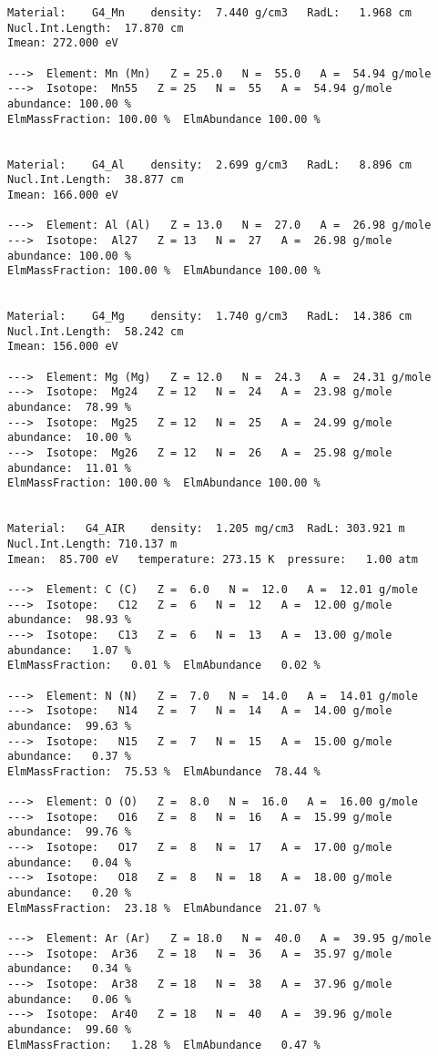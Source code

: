 {\begin{verbatim}
Material:    G4_Mn    density:  7.440 g/cm3   RadL:   1.968 cm   Nucl.Int.Length:  17.870 cm 
Imean: 272.000 eV 

--->  Element: Mn (Mn)   Z = 25.0   N =  55.0   A =  54.94 g/mole
--->  Isotope:  Mn55   Z = 25   N =  55   A =  54.94 g/mole   abundance: 100.00 %
ElmMassFraction: 100.00 %  ElmAbundance 100.00 % 


Material:    G4_Al    density:  2.699 g/cm3   RadL:   8.896 cm   Nucl.Int.Length:  38.877 cm 
Imean: 166.000 eV 

--->  Element: Al (Al)   Z = 13.0   N =  27.0   A =  26.98 g/mole
--->  Isotope:  Al27   Z = 13   N =  27   A =  26.98 g/mole   abundance: 100.00 %
ElmMassFraction: 100.00 %  ElmAbundance 100.00 % 


Material:    G4_Mg    density:  1.740 g/cm3   RadL:  14.386 cm   Nucl.Int.Length:  58.242 cm 
Imean: 156.000 eV 

--->  Element: Mg (Mg)   Z = 12.0   N =  24.3   A =  24.31 g/mole
--->  Isotope:  Mg24   Z = 12   N =  24   A =  23.98 g/mole   abundance:  78.99 %
--->  Isotope:  Mg25   Z = 12   N =  25   A =  24.99 g/mole   abundance:  10.00 %
--->  Isotope:  Mg26   Z = 12   N =  26   A =  25.98 g/mole   abundance:  11.01 %
ElmMassFraction: 100.00 %  ElmAbundance 100.00 % 


Material:   G4_AIR    density:  1.205 mg/cm3  RadL: 303.921 m    Nucl.Int.Length: 710.137 m  
Imean:  85.700 eV   temperature: 273.15 K  pressure:   1.00 atm

--->  Element: C (C)   Z =  6.0   N =  12.0   A =  12.01 g/mole
--->  Isotope:   C12   Z =  6   N =  12   A =  12.00 g/mole   abundance:  98.93 %
--->  Isotope:   C13   Z =  6   N =  13   A =  13.00 g/mole   abundance:   1.07 %
ElmMassFraction:   0.01 %  ElmAbundance   0.02 % 

--->  Element: N (N)   Z =  7.0   N =  14.0   A =  14.01 g/mole
--->  Isotope:   N14   Z =  7   N =  14   A =  14.00 g/mole   abundance:  99.63 %
--->  Isotope:   N15   Z =  7   N =  15   A =  15.00 g/mole   abundance:   0.37 %
ElmMassFraction:  75.53 %  ElmAbundance  78.44 % 

--->  Element: O (O)   Z =  8.0   N =  16.0   A =  16.00 g/mole
--->  Isotope:   O16   Z =  8   N =  16   A =  15.99 g/mole   abundance:  99.76 %
--->  Isotope:   O17   Z =  8   N =  17   A =  17.00 g/mole   abundance:   0.04 %
--->  Isotope:   O18   Z =  8   N =  18   A =  18.00 g/mole   abundance:   0.20 %
ElmMassFraction:  23.18 %  ElmAbundance  21.07 % 

--->  Element: Ar (Ar)   Z = 18.0   N =  40.0   A =  39.95 g/mole
--->  Isotope:  Ar36   Z = 18   N =  36   A =  35.97 g/mole   abundance:   0.34 %
--->  Isotope:  Ar38   Z = 18   N =  38   A =  37.96 g/mole   abundance:   0.06 %
--->  Isotope:  Ar40   Z = 18   N =  40   A =  39.96 g/mole   abundance:  99.60 %
ElmMassFraction:   1.28 %  ElmAbundance   0.47 % 



\end{verbatim}}
